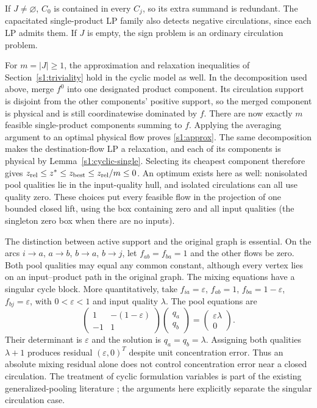 If $J\ne\varnothing$, $C_0$ is contained in every $C_j$, so its extra
summand is redundant. The capacitated single-product LP family also
detects negative circulations, since each LP admits them. If $J$ is
empty, the sign problem is an ordinary circulation problem.

For $m=|J|\ge1$, the approximation and relaxation inequalities of
Section~\ref{s1:triviality} hold in the cyclic model as well. In the
decomposition used above, merge $f^0$ into one designated product
component. Its circulation support is disjoint from the other components'
positive support, so the merged component is physical and is still
coordinatewise dominated by $f$. There are now exactly $m$ feasible
single-product components summing to $f$. Applying the averaging argument
to an optimal physical flow proves \eqref{s1:approx}. The same
decomposition makes the destination-flow LP a relaxation, and each of
its components is physical by Lemma~\ref{s1:cyclic-single}. Selecting
its cheapest component therefore gives
$z_{\rm rel}\le z^*\le z_{\rm best}\le z_{\rm rel}/m\le0$.
An optimum exists here as well: nonisolated pool qualities lie in the
input-quality hull, and isolated circulations can all use quality zero.
These choices put every feasible flow in the projection of one bounded
closed lift, using the box containing zero and all input qualities
(the singleton zero box when there are no inputs).

The distinction between active support and the original graph is
essential. On the arcs $i\to a$, $a\to b$, $b\to a$, $b\to j$, let
$f_{ab}=f_{ba}=1$ and the other flows be zero. Both pool qualities may
equal any common constant, although every vertex lies on an
input--product path in the original graph. The mixing equations have
a singular cycle block. More quantitatively, take
$f_{ia}=\varepsilon$, $f_{ab}=1$, $f_{ba}=1-\varepsilon$,
$f_{bj}=\varepsilon$, with $0<\varepsilon<1$ and input quality $\lambda$.
The pool equations are
\[
 \begin{pmatrix}1&-(1-\varepsilon)\\-1&1\end{pmatrix}
 \begin{pmatrix}q_a\\q_b\end{pmatrix}
 =\begin{pmatrix}\varepsilon\lambda\\0\end{pmatrix}.
\]
Their determinant is $\varepsilon$ and the solution is
$q_a=q_b=\lambda$. Assigning both qualities $\lambda+1$ produces residual
$(\varepsilon,0)^T$ despite unit concentration error. Thus an absolute
mixing residual alone does not control concentration error near a
closed circulation. The treatment of cyclic formulation variables is
part of the existing generalized-pooling literature
\citep[Section~4.3]{boland2016-new-multi-commodity-flow-formulations}; the arguments
here explicitly separate the singular circulation case.

